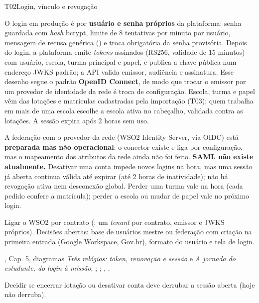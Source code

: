 \begin{resposta}{T02}{Login, vínculo e revogação}{\parcial}
\begin{campos}
  \item[Hoje] O login em produção é por \textbf{usuário e senha próprios} da
    plataforma: senha guardada com \emph{hash} bcrypt, limite de 8 tentativas
    por minuto por usuário, mensagem de recusa genérica () e troca
    obrigatória da senha provisória. Depois do login, a plataforma emite
    \emph{tokens} assinados (RS256, validade de 15 minutos) com usuário,
    escola, turma principal e papel, e publica a chave pública num endereço
    JWKS padrão; a API valida emissor, audiência e assinatura. Esse desenho
    segue o padrão \textbf{OpenID Connect}, de modo que trocar o emissor por um
    provedor de identidade da rede é troca de configuração. Escola, turma e
    papel vêm das lotações e matrículas cadastradas pela importação (T03);
    quem trabalha em mais de uma escola escolhe a escola ativa no cabeçalho,
    validada contra as lotações. A sessão expira após 2 horas sem uso.
  \item[Limitações] A federação com o provedor da rede (WSO2 Identity Server,
    via OIDC) está \textbf{preparada mas não operacional}: o conector existe e
    liga por configuração, mas o mapeamento dos atributos da rede ainda não
    foi feito. \textbf{SAML não existe atualmente.} Desativar uma conta
    impede novos logins na hora, mas uma sessão já aberta continua válida até
    expirar (até 2 horas de inatividade); não há revogação ativa nem
    desconexão global. Perder uma turma vale na hora (cada pedido confere a
    matrícula); perder a escola ou mudar de papel vale no próximo login.
  \item[Planejado] Ligar o WSO2 por contrato (:
    um \emph{tenant} por contrato, emissor e JWKS próprios). Decisões
    abertas: base de usuários mestre ou federação com criação na primeira
    entrada (Google Workspace, Gov.br), formato do usuário e tela de login.
  \item[Evidência] , Cap. 5, diagramas \emph{Três relógios:
    token, renovação e sessão} e \emph{A jornada do estudante, do login à
    missão}; ;
    ; ,
    .
  \item[Lacuna] Decidir se encerrar lotação ou desativar conta deve derrubar a
    sessão aberta (hoje não derruba).
\end{campos}
\end{resposta}

